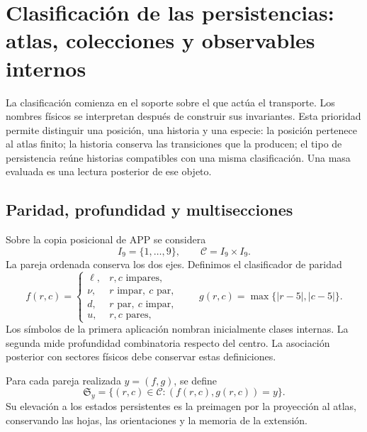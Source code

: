 \section{Clasificación de las persistencias: atlas, colecciones y observables internos}
\label{vi:sec:atlas}

La clasificación comienza en el soporte sobre el que actúa el transporte.
Los nombres físicos se interpretan después de construir sus invariantes.
Esta prioridad permite distinguir una posición, una historia y una especie:
la posición pertenece al atlas finito; la historia conserva las transiciones
que la producen; el tipo de persistencia reúne historias compatibles con una
misma clasificación. Una masa evaluada es una lectura posterior de ese objeto.

\subsection{Paridad, profundidad y multisecciones}

Sobre la copia posicional de APP se considera
\[
 I_9=\{1,\ldots,9\},\qquad \mathcal C=I_9\times I_9.
\]
La pareja ordenada conserva los dos ejes. Definimos el clasificador de paridad
\[
 f(r,c)=
 \begin{cases}
 \ell,&r,c\text{ impares},\\
 \nu,&r\text{ impar},\ c\text{ par},\\
 d,&r\text{ par},\ c\text{ impar},\\
 u,&r,c\text{ pares},
 \end{cases}
 \qquad g(r,c)=\max\{|r-5|,|c-5|\}.
\]
Los símbolos de la primera aplicación nombran inicialmente clases internas.
La segunda mide profundidad combinatoria respecto del centro. La asociación
posterior con sectores físicos debe conservar estas definiciones.



\begin{definition}
Para cada pareja realizada \(y=(f,g)\), se define
\[
 \mathfrak S_y=\{(r,c)\in\mathcal C:(f(r,c),g(r,c))=y\}.
\]
Su elevación a los estados persistentes es la preimagen por la proyección
al atlas, conservando las hojas, las orientaciones y la memoria de la extensión.
\end{definition}

